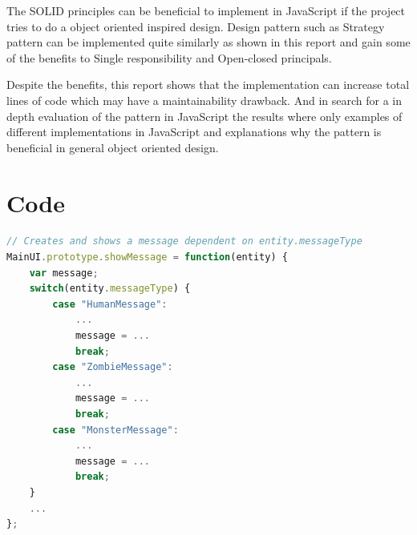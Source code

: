 \documentclass[conference, a4paper]{IEEEtran}
\begin{document}
The SOLID principles can be beneficial to implement in JavaScript if the project tries to do a object oriented inspired design. Design pattern such as Strategy pattern can be implemented quite similarly as shown in this report and gain some of the benefits to Single responsibility and Open-closed principals.

Despite the benefits, this report shows that the implementation can increase total lines of code which may have a maintainability drawback. And in search for a in depth evaluation of the pattern in JavaScript the results where only examples of different implementations in JavaScript and explanations why the pattern is beneficial in general object oriented design.

\clearpage
\section*{Code}

\begin{lstlisting}[language=JavaScript, label=lst:switch-case, caption=\texttt{MainUI.js} The original switch case.]
// Creates and shows a message dependent on entity.messageType
MainUI.prototype.showMessage = function(entity) {
	var message;
	switch(entity.messageType) {
		case "HumanMessage":
			...
			message = ...
			break;
		case "ZombieMessage":
			...
			message = ...
			break;
		case "MonsterMessage":
			...
			message = ...
			break;
	}
	...
};
\end{lstlisting}
\end{document}
